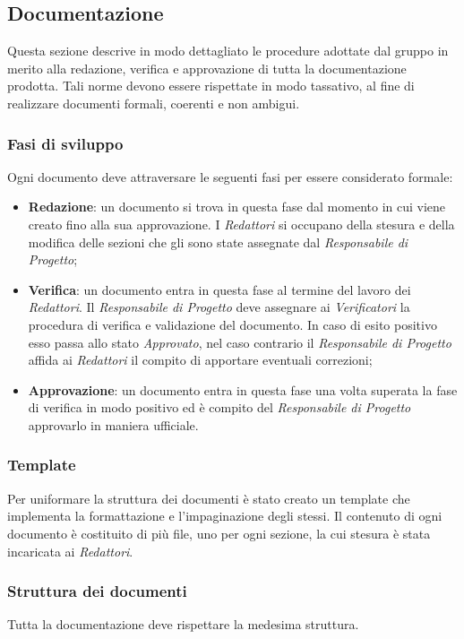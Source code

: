 \subsection{Documentazione}
Questa sezione descrive in modo dettagliato le procedure adottate dal gruppo in merito alla redazione, verifica e approvazione di tutta la documentazione prodotta. Tali norme devono essere rispettate in modo tassativo, al fine di realizzare documenti formali, coerenti e non ambigui.

\subsubsection{Fasi di sviluppo}
Ogni documento deve attraversare le seguenti fasi per essere considerato formale:
\begin{itemize}
	\item \textbf{Redazione}: un documento si trova in questa fase dal momento in cui viene creato fino alla sua approvazione. I \emph{Redattori} si occupano della stesura e della modifica delle sezioni che gli sono state assegnate dal \emph{Responsabile di Progetto};
	\item \textbf{Verifica}: un documento entra in questa fase al termine del lavoro dei \emph{Redattori}. Il \emph{Responsabile di Progetto} deve assegnare ai \emph{Verificatori} la procedura di verifica e validazione del documento. In caso di esito positivo esso passa allo stato \emph{Approvato}, nel caso contrario il \emph{Responsabile di Progetto} affida ai \emph{Redattori} il compito di apportare eventuali correzioni;
	\item \textbf{Approvazione}: un documento entra in questa fase una volta superata la fase di verifica in modo positivo ed è compito del \emph{Responsabile di Progetto} approvarlo in maniera ufficiale.
\end{itemize}

\subsubsection{Template}
Per uniformare la struttura dei documenti è stato creato un template  che implementa la formattazione e l'impaginazione degli stessi. Il contenuto di ogni documento è costituito di più file, uno per ogni sezione, la cui stesura è stata incaricata ai \emph{Redattori}.

\subsubsection{Struttura dei documenti}
Tutta la documentazione deve rispettare la medesima struttura.


